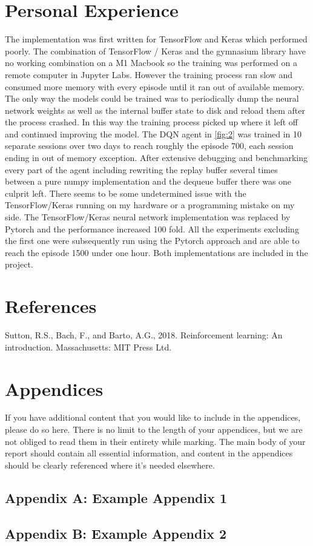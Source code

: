 \documentclass{article}
\begin{document}
\section{Personal Experience}
The implementation was first written for TensorFlow and Keras which performed poorly. The combination of TensorFlow / Keras and the gymnasium library have no working combination on a M1 Macbook so the training was performed on a remote computer in Jupyter Labs. However the training process ran  slow and consumed more memory with every episode until it ran out of available memory. The only way the models could be trained was to periodically dump the neural network weights as well as the internal buffer state to disk and reload them after the process crashed. In this way the training process picked up where it left off and continued improving the model. The DQN agent in \ref{fig:2} was trained in 10 separate sessions over two days to reach roughly the episode 700, each session ending in out of memory exception.  After extensive debugging and benchmarking every part of the agent including rewriting the replay buffer several times between a pure numpy implementation and the dequeue buffer there was one culprit left. There seems to be some undetermined issue with the TensorFlow/Keras running on my hardware or a programming mistake on my side. The TensorFlow/Keras neural network implementation was replaced by Pytorch and the performance increased 100 fold. All the experiments excluding the first one were subsequently run using the Pytorch approach and are able to reach the episode 1500 under one hour. Both implementations are included in the project.

\section*{References}
\small Sutton, R.S., Bach, F., and Barto, A.G., 2018. Reinforcement learning: An introduction. Massachusetts: MIT Press Ltd. 

\normalsize
\newpage
\section*{Appendices}
If you have additional content that you would like to include in the appendices, please do so here.
There is no limit to the length of your appendices, but we are not obliged to read them in their entirety while marking. The main body of your report should contain all essential information, and content in the appendices should be clearly referenced where it's needed elsewhere.
\subsection*{Appendix A: Example Appendix 1}
\subsection*{Appendix B: Example Appendix 2}
\end{document}
